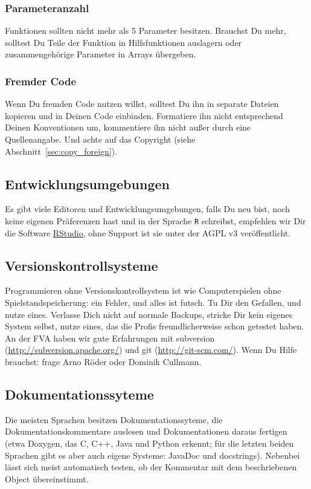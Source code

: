 \documentclass[twoside]{scrartcl}
\providecommand{\R}{\texttt{R}}
\begin{document}
\subsubsection{Parameteranzahl\label{sec:parameteranzahl}} 
Funktionen sollten nicht mehr als 5 Parameter besitzen.
Brauchst Du mehr, solltest Du Teile der Funktion in Hilfsfunktionen auslagern
oder zusammengeh\"o{}rige Parameter in Arrays \"u{}bergeben.

\subsubsection{Fremder Code} 
Wenn Du fremden Code nutzen willst, solltest Du ihn in separate Dateien kopieren
und in Deinen Code einbinden. 
Formatiere ihn nicht entsprechend Deinen Konventionen um, 
kommentiere ihn nicht au\ss{}er durch eine Quellenangabe. 
Und achte auf das Copyright (siehe Abschnitt~\ref{sec:copy_foreign}).

\subsection{Entwicklungsumgebungen}
Es gibt viele Editoren und Entwicklungsumgebungen, falls Du neu bist, noch keine
eigenen Pr\"a{}ferenzen hast und in der Sprache \R{} schreibst, empfehlen wir 
Dir die Software \href{http://www.rstudio.com/products/rstudio/}{RStudio}, 
ohne Support ist sie unter der AGPL v3 ver\"o{}ffentlicht.

\subsection{Versionskontrollsysteme\label{sec:vcs}}
Programmieren ohne Versionskontrollsystem ist wie Computerspielen ohne 
Spielstandspeicherung: ein Fehler, und alles ist futsch.
Tu Dir den Gefallen, und nutze eines.
Verlasse Dich nicht auf normale Backups, stricke Dir kein eigenes System selbst,
nutze eines, das die Profis freundlicherweise schon getestet haben. 
An der FVA haben wir gute Erfahrungen mit 
subversion (\url{http://subversion.apache.org/})
und git (\url{http://git-scm.com/}).
Wenn Du Hilfe brauchst: frage Arno R\"o{}der oder Dominik Cullmann.  

\subsection{Dokumentationssyteme}
Die meisten Sprachen besitzen Dokumentationssyteme, die Dokumentationskommentare
auslesen und Dokumentationen daraus fertigen (etwa Doxygen, das C, C++, Java und
Python erkennt; f\"u{}r die letzten beiden Sprachen gibt es aber auch eigene
Systeme: JavaDoc und docstrings). 
Nebenbei l\"a{}sst sich meist automatisch testen, ob der
Kommentar mit dem beschriebenen Object \"u{}bereinstimmt. 
\end{document}
